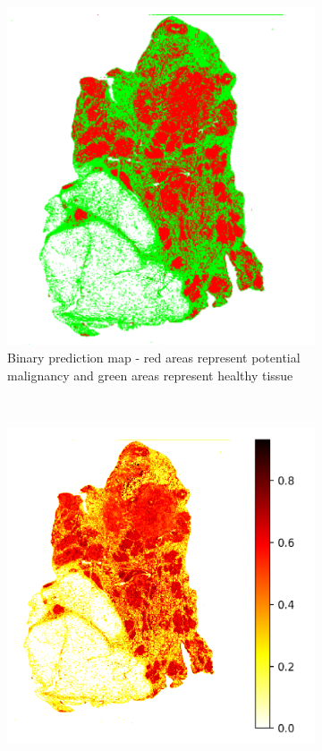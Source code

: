 \documentclass{l4proj}
\begin{document}
\begin{figure}[h]
    \centering
    \begin{subfigure}[b]{0.4\textwidth}
        \includegraphics[scale=0.3]{images/TCGA-BH-A1FE-noback.png}
        \caption{Binary prediction map - red areas represent potential malignancy and green areas represent healthy tissue}
        \label{fig:binary-map}
    \end{subfigure}\hfill%
    ~~
    \begin{subfigure}[b]{0.4\textwidth}
        \includegraphics[scale=0.23]{images/TCGA-BH-A1FE-continuous.png}

\end{subfigure}
\end{figure}
\end{document}
